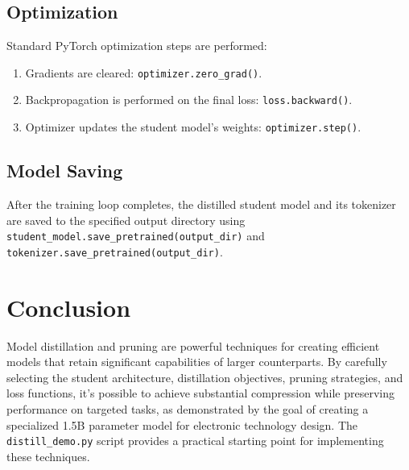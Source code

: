 \documentclass{article}
\begin{document}
\subsection{Optimization}
Standard PyTorch optimization steps are performed:
\begin{enumerate}
    \item Gradients are cleared: \texttt{optimizer.zero\_grad()}.
    \item Backpropagation is performed on the final loss: \texttt{loss.backward()}.
    \item Optimizer updates the student model's weights: \texttt{optimizer.step()}.
\end{enumerate}

\subsection{Model Saving}
After the training loop completes, the distilled student model and its tokenizer are saved to the specified output directory using \texttt{student\_model.save\_pretrained(output\_dir)} and \texttt{tokenizer.save\_pretrained(output\_dir)}.

\section{Conclusion}
Model distillation and pruning are powerful techniques for creating efficient models that retain significant capabilities of larger counterparts. By carefully selecting the student architecture, distillation objectives, pruning strategies, and loss functions, it's possible to achieve substantial compression while preserving performance on targeted tasks, as demonstrated by the goal of creating a specialized 1.5B parameter model for electronic technology design. The \texttt{distill\_demo.py} script provides a practical starting point for implementing these techniques.
\end{document}
